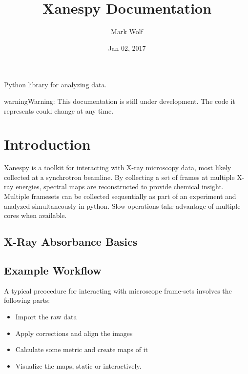 \documentclass[letterpaper,10pt,english]{sphinxmanual}
\title{Xanespy Documentation}
\date{Jan 02, 2017}
\author{Mark Wolf}
\begin{document}
\maketitle
\sphinxtableofcontents
{}\label{\detokenize{index::doc}}


Python library for analyzing  data.

\begin{sphinxadmonition}{warning}{Warning:}
This documentation is still under development. The code
it represents could change at any time.
\end{sphinxadmonition}


\chapter{Introduction}
\label{\detokenize{intro:xanespy-documentation}}\label{\detokenize{intro::doc}}\label{\detokenize{intro:introduction}}
Xanespy is a toolkit for interacting with X-ray microscopy data, most
likely collected at a synchrotron beamline. By collecting a set of
frames at multiple X-ray energies, spectral maps are reconstructed to
provide chemical insight. Multiple framesets can be collected
sequentially as part of an  experiment and analyzed
simultaneously in python. Slow operations take advantage of multiple
cores when available.


\section{X-Ray Absorbance Basics}
\label{\detokenize{intro:x-ray-absorbance-basics}}

\section{Example Workflow}
\label{\detokenize{intro:example-workflow}}
A typical prcocedure for interacting with microscope frame-sets involves the following parts:
\begin{itemize}
\item {} 
Import the raw data

\item {} 
Apply corrections and align the images

\item {} 
Calculate some metric and create maps of it

\item {} 
Visualize the maps, static or interactively.

\end{itemize}
\end{document}
